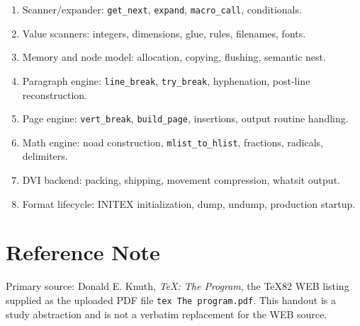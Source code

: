 \documentclass[11pt]{article}
\providecommand{\tightlist}{\setlength{\itemsep}{0pt}\setlength{\parskip}{0pt}}
\begin{document}
\begin{enumerate}
\def\labelenumi{\arabic{enumi}.}
\tightlist
\item
  Scanner/expander: \texttt{get\_next},
  \texttt{expand},
  \texttt{macro\_call}, conditionals.
\item
  Value scanners: integers, dimensions, glue, rules, filenames, fonts.
\item
  Memory and node model: allocation, copying, flushing, semantic nest.
\item
  Paragraph engine: \texttt{line\_break},
  \texttt{try\_break}, hyphenation, post-line
  reconstruction.
\item
  Page engine: \texttt{vert\_break},
  \texttt{build\_page}, insertions, output routine
  handling.
\item
  Math engine: noad construction,
  \texttt{mlist\_to\_hlist}, fractions, radicals,
  delimiters.
\item
  DVI backend: packing, shipping, movement compression, whatsit output.
\item
  Format lifecycle: INITEX initialization, dump, undump, production
  startup.
\end{enumerate}

\newpage
\section*{Reference Note}
Primary source: Donald E. Knuth, \textit{TeX: The Program}, the TeX82 WEB listing supplied as the uploaded PDF file \texttt{tex The program.pdf}. This handout is a study abstraction and is not a verbatim replacement for the WEB source.
\end{document}
